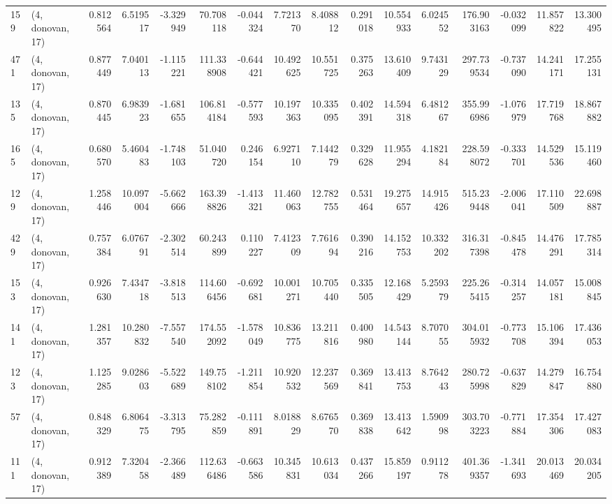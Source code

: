 \begin{tabular}{llrrrrrrrrrrrrrr}
159 &  (4, donovan, 17) &   0.812564 &   6.519517 &  -3.329949 &    70.708118 &  -0.044324 &   7.721370 &   8.408812 &  0.291018 &  10.554933 &   6.024552 &   176.903163 &  -0.032099 &  11.857822 &  13.300495 \\
471 &  (4, donovan, 17) &   0.877449 &   7.040113 &  -1.115221 &   111.338908 &  -0.644421 &  10.492625 &  10.551725 &  0.375263 &  13.610409 &   9.743129 &   297.739534 &  -0.737090 &  14.241171 &  17.255131 \\
135 &  (4, donovan, 17) &   0.870445 &   6.983923 &  -1.681655 &   106.814184 &  -0.577593 &  10.197363 &  10.335095 &  0.402391 &  14.594318 &   6.481267 &   355.996986 &  -1.076979 &  17.719768 &  18.867882 \\
165 &  (4, donovan, 17) &   0.680570 &   5.460483 &  -1.748103 &    51.040720 &   0.246154 &   6.927110 &   7.144279 &  0.329628 &  11.955294 &   4.182184 &   228.598072 &  -0.333701 &  14.529536 &  15.119460 \\
129 &  (4, donovan, 17) &   1.258446 &  10.097004 &  -5.662666 &   163.398826 &  -1.413321 &  11.460063 &  12.782755 &  0.531464 &  19.275657 &  14.915426 &   515.239448 &  -2.006041 &  17.110509 &  22.698887 \\
429 &  (4, donovan, 17) &   0.757384 &   6.076791 &  -2.302514 &    60.243899 &   0.110227 &   7.412309 &   7.761694 &  0.390216 &  14.152753 &  10.332202 &   316.317398 &  -0.845478 &  14.476291 &  17.785314 \\
153 &  (4, donovan, 17) &   0.926630 &   7.434718 &  -3.818513 &   114.606456 &  -0.692681 &  10.001271 &  10.705440 &  0.335505 &  12.168429 &   5.259379 &   225.265415 &  -0.314257 &  14.057181 &  15.008845 \\
141 &  (4, donovan, 17) &   1.281357 &  10.280832 &  -7.557540 &   174.552092 &  -1.578049 &  10.836775 &  13.211816 &  0.400980 &  14.543144 &   8.707055 &   304.015932 &  -0.773708 &  15.106394 &  17.436053 \\
123 &  (4, donovan, 17) &   1.125285 &   9.028603 &  -5.522689 &   149.758102 &  -1.211854 &  10.920532 &  12.237569 &  0.369841 &  13.413753 &   8.764243 &   280.725998 &  -0.637829 &  14.279847 &  16.754880 \\
57  &  (4, donovan, 17) &   0.848329 &   6.806475 &  -3.313795 &    75.282859 &  -0.111891 &   8.018829 &   8.676570 &  0.369838 &  13.413642 &   1.590998 &   303.703223 &  -0.771884 &  17.354306 &  17.427083 \\
111 &  (4, donovan, 17) &   0.912389 &   7.320458 &  -2.366489 &   112.636486 &  -0.663586 &  10.345831 &  10.613034 &  0.437266 &  15.859197 &   0.911278 &   401.369357 &  -1.341693 &  20.013469 &  20.034205 \\

\end{tabular}
